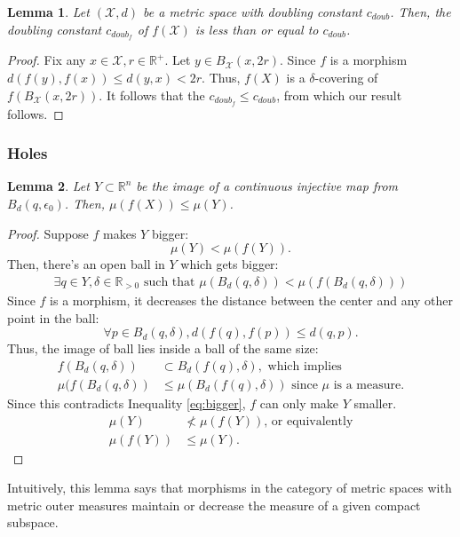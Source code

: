 \documentclass{article}
\newtheorem{lemma}{Lemma}
\newcommand{\R}{\mathbb{R}}
\begin{document}
\begin{lemma}
Let $(\mathcal{X},d)$ be a metric space with doubling constant $c_{doub}$.
Then, the doubling constant $c_{doub_f}$ of $f(\mathcal{X})$ is less than or equal to $c_{doub}$.
\end{lemma}
\begin{proof}
Fix any $x\in\mathcal{X},r\in\R^+$.
Let $y\in B_{\mathcal{X}}(x,2r)$.
Since $f$ is a morphism $d(f(y),f(x))\le d(y,x)<2r$.
Thus, $f(X)$ is a $\delta$-covering of $f(B_{\mathcal{X}}(x,2r))$.
It follows that the $c_{doub_f}\le c_{doub}$, from which our result follows.
\end{proof}

\subsubsection{Holes}
\begin{lemma}\label{lem:bigger}
Let $Y\subset \R^n$ be the image of a continuous injective map from $B_d(q,\epsilon_0)$. Then, $\mu(f(X))\le \mu(Y)$.
\end{lemma}
\begin{proof}
Suppose $f$ makes $Y$ bigger:
$$\mu(Y)<\mu(f(Y)).$$
Then, there's an open ball in $Y$ which gets bigger:
\begin{align}\label{eq:bigger}
    \exists q\in Y, \delta\in \R_{>0} \text{ such that } \mu(B_d(q,\delta))< \mu(f(B_d(q,\delta)))
\end{align}
Since $f$ is a morphism, it decreases the distance between the center and any other point in the ball:
$$\forall p\in B_d(q,\delta),  d(f(q), f(p))\le d(q,p).$$
Thus, the image of ball lies inside a ball of the same size:
\begin{align*}
    f(B_d(q,\delta)) &\subset B_d(f(q), \delta), \text{ which implies }\\
    \mu(f(B_d(q,\delta)) &\le \mu(B_d(f(q), \delta)) \text{ since $\mu$ is a measure.}
\end{align*}
Since this contradicts Inequality \ref{eq:bigger}, $f$ can only make $Y$ smaller.
\begin{align*}
    \mu(Y) &\nless \mu(f(Y)) \text{, or equivalently} \\
    \mu(f(Y)) &\le \mu(Y).
\end{align*}
\end{proof}
Intuitively, this lemma says that morphisms in the category of metric spaces with metric outer measures maintain or decrease the measure of a given compact subspace.
\end{document}
